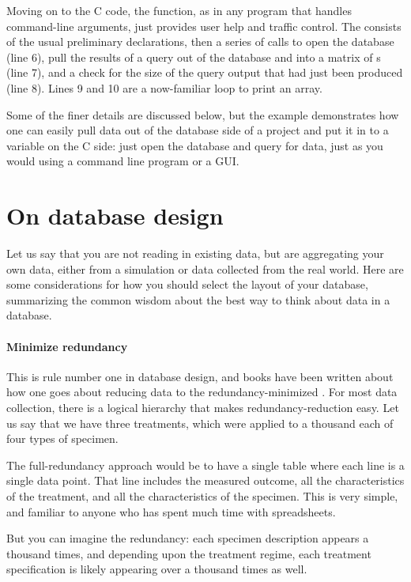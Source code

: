 Moving on to the C code, the  function, as in any program that
handles command-line arguments, just provides user help and traffic
control.  The  consists of the usual preliminary
declarations, then a series of calls to open the database (line 6), pull
the results of a query out of the database and into a matrix of s
(line 7), and a check for the size of the query output that had just been produced
(line 8). Lines 9 and 10 are a now-familiar loop to print an array.

Some of the finer details are discussed below, but the example
demonstrates how one can easily pull data out of the database side of
a project and put it in to a variable on the C side: just open the
database and query for data, just as you would using a command line
program or a GUI.


\section{On database design}
Let us say that you are not reading in existing data, but are
aggregating your own data, either from a simulation or data
collected from the real world. Here are some considerations for how you
should select the layout of your database, summarizing the common wisdom
about the best way to think about data in a database.

\paragraph{Minimize redundancy} This is rule number one in database
design, and books have been written about how one goes about reducing
data to the redundancy-minimized . For most data collection, there is a
logical hierarchy that makes redundancy-reduction easy. Let us say that
we have three treatments, which were applied to a thousand each of four
types of specimen.

The full-redundancy approach would be to have a single table where each
line is a single data point.  That line includes the measured outcome,
all the characteristics of the treatment, and all the characteristics
of the specimen.  This is very simple, and familiar to anyone who has
spent much time with spreadsheets.

But you can imagine the redundancy: each specimen description appears a
thousand times, and depending upon the treatment regime, each treatment
specification is likely appearing over a thousand times as well.

